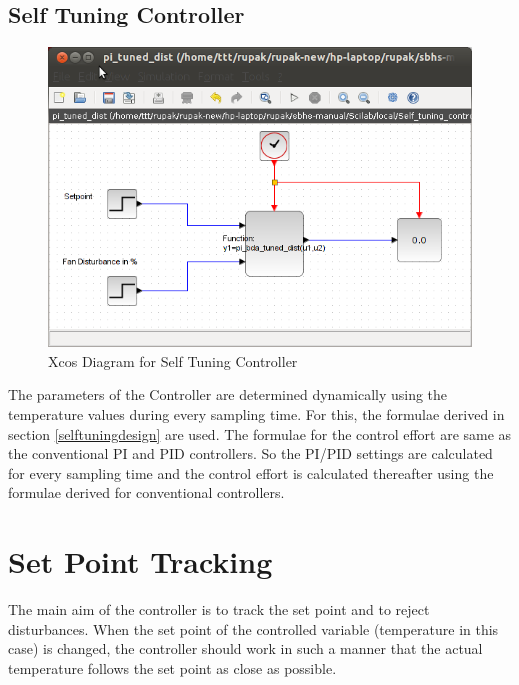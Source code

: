 \newpage
\subsection{Self Tuning Controller}
\begin{figure}[h]
\centering
	\includegraphics[width = \textwidth]{Vikas_self/report_tex/implementation/pi_dist_self.png}
		\caption{Xcos Diagram for Self Tuning Controller}
	\label{selftuning}
\end{figure}

The parameters of the Controller are determined dynamically using the temperature values during every sampling time. For this, the formulae derived in section \ref{selftuningdesign} are used. The formulae for the control effort are same as the conventional PI and PID controllers. So the PI/PID settings are calculated for every sampling time and the control effort is calculated thereafter using the formulae derived for conventional controllers.
%
%
%	
\section{Set Point Tracking}

The main aim of the controller is to track the set point and to reject disturbances. When the set point of the controlled variable (temperature in this case) is changed, the controller should work in such a manner that the actual temperature follows the set point as close as possible.\\

